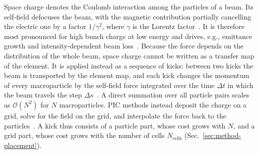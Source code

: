 Space charge denotes the Coulomb interaction among the particles of a
beam. Its self-field defocuses the beam, with the magnetic contribution
partially cancelling the electric one by a factor $1/\gamma^2$, where
$\gamma$ is the Lorentz factor~\cite{schindl2006spacecharge}. It is
therefore most pronounced for high bunch charge at low energy and drives,
e.g., emittance growth and intensity-dependent beam
loss~\cite{dhamrait2026memory}. Because the force depends on the
distribution of the whole beam, space charge cannot be written as a
transfer map of the element. It is applied instead as a sequence of
kicks: between two kicks the beam is transported by the element map, and
each kick changes the momentum of every macroparticle by the self-field
force integrated over the time $\Delta t$ in which the beam travels the
step $\Delta s$~\cite{dhamrait2026memory}. A direct summation over all
particle pairs scales as $\mathcal{O}(N^2)$ for $N$ macroparticles. PIC
methods instead deposit the charge on a grid, solve for the field on the
grid, and interpolate the force back to the
particles~\cite{birdsall2004plasma,hockney1988computer}. A kick thus
consists of a particle part, whose cost grows with $N$, and a grid part,
whose cost grows with the number of cells $N_\mathrm{cells}$
(Sec.~\ref{sec:method-placement}).

